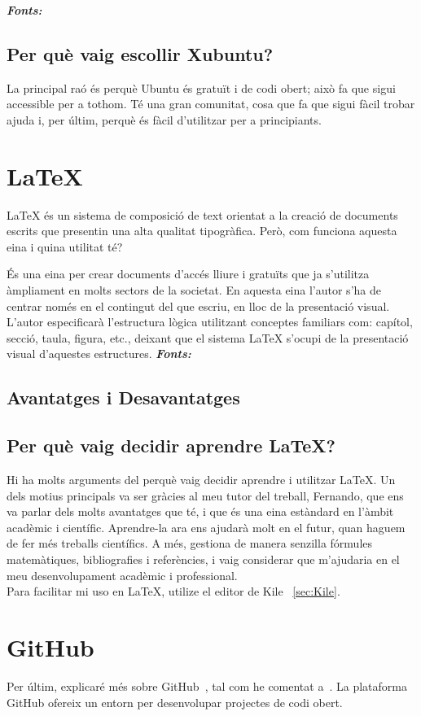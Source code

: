 \textit{\textbf{Fonts:}} \cite{GD}

\subsection{Per què vaig escollir Xubuntu?}
La principal raó és perquè Ubuntu és gratuït i de codi obert; això fa que sigui accessible per a tothom. Té una gran comunitat, cosa que fa que sigui fàcil trobar ajuda i, per últim, perquè és fàcil d’utilitzar per a principiants.

\section{LaTeX} \label{sec:latex}
LaTeX \cite{LaTeX} és un sistema de composició de text orientat a la creació de documents escrits que presentin una alta qualitat tipogràfica. Però, com funciona aquesta eina i quina utilitat té?

És una eina per crear documents d’accés lliure i gratuïts que ja s’utilitza àmpliament en molts sectors de la societat. En aquesta eina l’autor s’ha de centrar només en el contingut del que escriu, en lloc de la presentació visual. L’autor especificarà l’estructura lògica utilitzant conceptes familiars com: capítol, secció, taula, figura, etc., deixant que el sistema LaTeX s’ocupi de la presentació visual d’aquestes estructures.
\textit{\textbf{Fonts:}} \cite{CH}
\subsection{Avantatges i Desavantatges}
\subsection{Per què vaig decidir aprendre LaTeX?}
Hi ha molts arguments del perquè vaig decidir aprendre i utilitzar LaTeX. Un dels motius principals va ser gràcies al meu tutor del treball, Fernando, que ens va parlar dels molts avantatges que té, i que és una eina estàndard en l’àmbit acadèmic i científic. Aprendre-la ara ens ajudarà molt en el futur, quan haguem de fer més treballs científics. A més, gestiona de manera senzilla fórmules matemàtiques, bibliografies i referències, i vaig considerar que m’ajudaria en el meu desenvolupament acadèmic i professional.\\

Para facilitar mi uso en LaTeX, utilize el editor de Kile ~\ref{sec:Kile}.

\section{GitHub} \label{c:GH}
Per últim, explicaré més sobre GitHub~\cite{GitHub}, tal com he comentat a~. La plataforma GitHub ofereix un entorn per desenvolupar projectes de codi obert.

